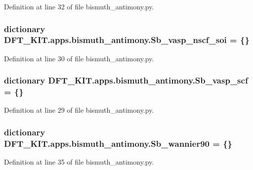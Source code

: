 Definition at line 32 of file bismuth\+\_\+antimony.\+py.

\hypertarget{namespace_d_f_t___k_i_t_1_1apps_1_1bismuth__antimony_aaf0784cd6faa22be296849a9edac5b29}{
\subsubsection[{Sb\+\_\+vasp\+\_\+nscf\+\_\+soi}]{\setlength{\rightskip}{0pt plus 5cm}dictionary D\+F\+T\+\_\+\+K\+I\+T.\+apps.\+bismuth\+\_\+antimony.\+Sb\+\_\+vasp\+\_\+nscf\+\_\+soi = \{\}}}\label{namespace_d_f_t___k_i_t_1_1apps_1_1bismuth__antimony_aaf0784cd6faa22be296849a9edac5b29}


Definition at line 30 of file bismuth\+\_\+antimony.\+py.

\hypertarget{namespace_d_f_t___k_i_t_1_1apps_1_1bismuth__antimony_ac29eda409a16938d88021a96729db286}{
\subsubsection[{Sb\+\_\+vasp\+\_\+scf}]{\setlength{\rightskip}{0pt plus 5cm}dictionary D\+F\+T\+\_\+\+K\+I\+T.\+apps.\+bismuth\+\_\+antimony.\+Sb\+\_\+vasp\+\_\+scf = \{\}}}\label{namespace_d_f_t___k_i_t_1_1apps_1_1bismuth__antimony_ac29eda409a16938d88021a96729db286}


Definition at line 29 of file bismuth\+\_\+antimony.\+py.

\hypertarget{namespace_d_f_t___k_i_t_1_1apps_1_1bismuth__antimony_a0ea685695e01c80f5dce15e6982ed14d}{
\subsubsection[{Sb\+\_\+wannier90}]{\setlength{\rightskip}{0pt plus 5cm}dictionary D\+F\+T\+\_\+\+K\+I\+T.\+apps.\+bismuth\+\_\+antimony.\+Sb\+\_\+wannier90 = \{\}}}\label{namespace_d_f_t___k_i_t_1_1apps_1_1bismuth__antimony_a0ea685695e01c80f5dce15e6982ed14d}


Definition at line 35 of file bismuth\+\_\+antimony.\+py.

